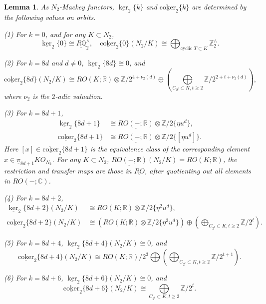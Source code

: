 \documentclass{amsart}
\theoremstyle{plain}
\newtheorem{lemma}[theorem]{Lemma}
\theoremstyle{definition}
\theoremstyle{remark}
\begin{document}
\begin{lemma}\label{lem:psi-1}
    As $N_2$-Mackey functors, $\underline{\ker}_2\{k\}$ and $\underline{\mathrm{coker}}_2\{k\}$ are determined by the following values on orbits.
    
    (1) For $k=0$, and for any $K\subset N_2$,
        \[\underline{\ker}_2\{0\}\cong \underline{R\mathbb{Q}}_2^\wedge, \quad \underline{\mathrm{coker}}_2\{0\}(N_2/K)\cong \bigoplus_{\text{cyclic } T\subset K}\mathbb{Z}_2^\wedge.\]

    (2) For $k=8d$ and $d\neq 0$, $\underline{\ker}_2\{8d\}\cong 0$, and \[\underline{\mathrm{coker}}_2\{8d\}(N_2/K)\cong RO(K;\mathbb{R})\otimes \mathbb{Z}/2^{4+\nu_2(d)} \oplus (\bigoplus\limits_{C_{2^t}\subset K, t\geq 2} \mathbb{Z}/2^{2+t+\nu_2(d)}),\]
        where $\nu_2$ is the $2$-adic valuation.%

    (3) For $k=8d+1$,
        \[
        \begin{aligned}
           \underline{\ker}_2\{8d+1\} & \cong \underline{RO(-;\mathbb{R})}\otimes \mathbb{Z}/2\{\eta u^d\},\\ 
           \underline{\mathrm{coker}}_2\{8d+1\} & \cong \underline{RO(-;\mathbb{R})}\otimes \mathbb{Z}/2\{[\eta u^d]\}.
        \end{aligned}
        \]
        Here $[x]\in \underline{\mathrm{coker}}_2\{8d+1\}$ is the equivalence class of the corresponding element $x\in \underline{\pi}_{8d+1}KO_{N_2}$.  For any $K\subset N_2$, $\underline{RO(-;\mathbb{R})}(N_2/K)=RO(K;\mathbb{R})$, the restriction and transfer maps are those in $\underline{RO}$, after quotienting out all elements in $RO(-;\mathbb{C})$.
    
    (4) For $k=8d+2$,
    \[\begin{aligned}
        \underline{\ker}_2\{8d+2\}(N_2/K) & \cong RO(K;\mathbb{R})\otimes \mathbb{Z}/2\{\eta^2 u^d\},\\
        \underline{\mathrm{coker}}_2\{8d+2\}(N_2/K) & \cong (RO(K;\mathbb{R})\otimes \mathbb{Z}/2\{\eta^2 u^d\}) \oplus (\bigoplus\limits_{C_{2^t}\subset K, t\geq 2} \mathbb{Z}/2^{t}).
    \end{aligned}
    \]

    (5) For $k=8d+4$,  $\underline{\ker}_2\{8d+4\}(N_2/K) \cong 0$, and 
    \[
       \underline{\mathrm{coker}}_2\{8d+4\}(N_2/K) \cong RO(K;\mathbb{R})/2^3 \bigoplus (\bigoplus_{C_{2^t}\subset K, t\geq 2} \mathbb{Z}/2^{t+1}).
    \]

    (6) For $k=8d+6$, $\underline{\ker}_2\{8d+6\}(N_2/K) \cong 0$, and 
    \[
        \underline{\mathrm{coker}}_2\{8d+6\}(N_2/K) \cong \bigoplus\limits_{C_{2^t}\subset K, t\geq 2} \mathbb{Z}/2^{t}.
    \] 
\end{lemma}
\end{document}
